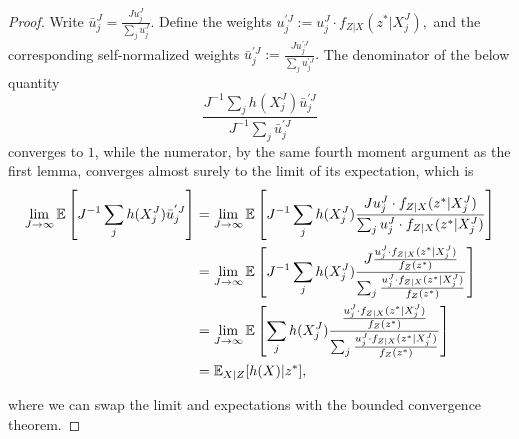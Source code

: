 \documentclass{article}
\begin{document}
\begin{proof}
    Write $\bar{u}_j^{J} = \frac{J u_j^J}{\sum_j u_j^J}$. Define the weights $u^{' J}_j := u_j^J \cdot f_{Z|X}(z^*|X_j^J),$ and the corresponding self-normalized weights $\bar{u}_j^{' J} := \frac{J u^{' J}_j}{\sum_j u^{' J}_j}.$ The denominator of the below quantity 
    $$ \frac{J^{-1} \sum_j h(X_j^J) \bar{u}_j^{' J}}{J^{-1} \sum_j \bar{u}_j^{' J}}$$
    converges to $1$, while the numerator, by the same fourth moment argument as the first lemma, converges almost surely to the limit of its expectation, which is
    \begin{align*}
        \lim_{J\to\infty} \mathbb{E}\left[J^{-1} \sum_j h(X_j^J) \bar{u}_j^{' J} \right]
        &= \lim_{J\to\infty} \mathbb{E}\left[J^{-1} \sum_j h(X_j^J) \frac{J u_j^J \cdot f_{Z|X}(z^*|X_j^J)}{\sum_j u_j^J \cdot f_{Z|X}(z^*|X_j^J)}\right] \\
        &= \lim_{J\to\infty} \mathbb{E}\left[J^{-1} \sum_j h(X_j^J) \frac{J \frac{u_j^J \cdot f_{Z|X}(z^*|X_j^J)}{f_Z(z^*)}}{\sum_j \frac{u_j^J \cdot f_{Z|X}(z^*|X_j^J)}{f_Z(z^*)}}\right]\\
        &= \lim_{J\to\infty} \mathbb{E}\left[ \sum_j h(X_j^J) \frac{\frac{u_j^J \cdot f_{Z|X}(z^*|X_j^J)}{f_Z(z^*)}}{\sum_j \frac{u_j^J \cdot f_{Z|X}(z^*|X_j^J)}{f_Z(z^*)}}\right]\\
        &= \mathbb{E}_{X|Z}[h(X)|z^*],
    \end{align*}

    where we can swap the limit and expectations with the bounded convergence theorem.
\end{proof}
\end{document}
